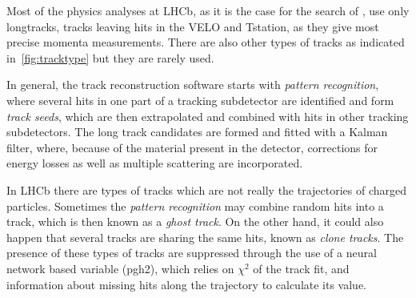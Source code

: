 
Most of the physics analyses at \gls{LHCb}, as it is the case for the search of \Bmumumu, use only \gls{longtrack}s, tracks leaving hits in the \Gls{VELO} and \Gls{Tstation}, as they give most precise momenta measurements. There are also other types of tracks as indicated in~\autoref{fig:tracktype} but they are rarely used.

In general, the track reconstruction software starts with \textit{pattern recognition}, where several hits in one part of a tracking subdetector are identified and form \textit{track seeds}, which are then extrapolated and combined with hits in other tracking subdetectors. The long track candidates are formed and fitted with a Kalman filter\cite{Hierk:684697}, where, because of the material present in the detector, corrections for energy losses as well as multiple scattering are incorporated.

In \gls{LHCb} there are types of tracks which are not really the trajectories of charged particles.
Sometimes the \textit{pattern recognition} may combine random hits into a track, which is then known as a \textit{ghost track}. On the other hand, it could also happen that several tracks are sharing the same hits, known as \textit{clone tracks}. The presence of these types of tracks are suppressed through the use of a neural network based variable (\Gls{pgh2}), which relies on \DIFaddbegin {}\DIFaddend $\chi^{2}$ of the track fit, and information about missing hits along the trajectory to calculate its value.

